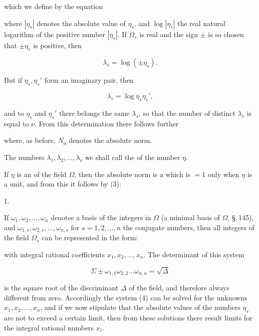 which we define by the equation


where $|\eta_s|$ denotes the absolute value of $\eta_s$, and $\log|\eta_s|$ the real natural logarithm of the positive number $|\eta_s|$. If $\Omega_s$ is real and the sign $\pm$ is so chosen that $\pm \eta_s$ is positive, then

\[ \lambda_s = \log(\pm \eta_s). \]

But if $\eta_s, \eta_s'$ form an imaginary pair, then

\[ \lambda_s = \log \eta_s \eta_s', \]

and to $\eta_s$ and $\eta_s'$ there belongs the same $\lambda_s$, so that the number of distinct $\lambda_s$ is equal to $\nu$. From this determination there follows further


where, as before, $N_a$ denotes the absolute norm.

The numbers $\lambda_1, \lambda_2, \ldots, \lambda_\nu$ we shall call the  of the number $\eta$.

If $\eta$ is an  of the field $\Omega$, then the absolute norm is a  which is $= 1$ only when $\eta$ is a unit, and from this it follows by (3):

1. 

If $\omega_1, \omega_2, \ldots, \omega_n$ denotes a basis of the integers in $\Omega$ (a minimal basis of $\Omega$, \S.\,145), and $\omega_{1,s}, \omega_{2,s}, \ldots, \omega_{n,s}$ for $s = 1, 2, \ldots, n$ the conjugate numbers, then all integers of the field $\Omega_s$ can be represented in the form:


with integral rational coefficients $x_1, x_2, \ldots, x_n$. The determinant of this system

\[ \Sigma \pm \omega_{1,1} \omega_{2,2} \ldots \omega_{n,n} = \sqrt{\Delta} \]

is the square root of the discriminant $\Delta$ of the field, and therefore always different from zero. Accordingly the system (4) can be solved for the unknowns $x_1, x_2, \ldots, x_n$, and if we now stipulate that the absolute values of the numbers $\eta_s$ are not to exceed a certain limit, then from these solutions there result limits for the integral rational numbers $x_i$.
